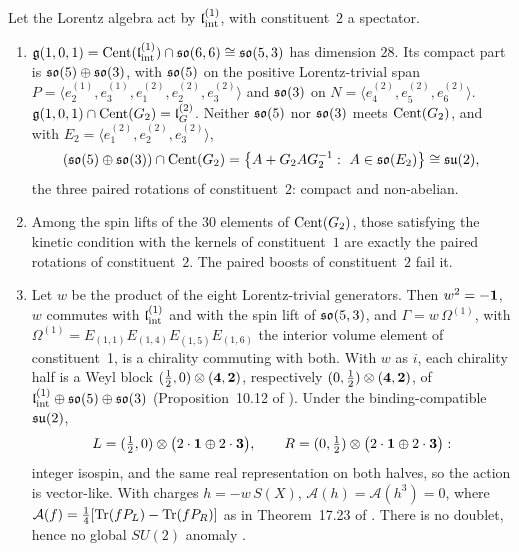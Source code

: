 \begin{proposition}
\label{e5:prop:spectator}
Let the Lorentz algebra act by $\mathfrak l_{\rm int}^{(1)}$, with constituent~$2$ a spectator.
\begin{enumerate}[label=(\roman*),leftmargin=2.2em]
\item $\mathfrak g(1,0,1)=\operatorname{Cent}(\mathfrak l_{\rm int}^{(1)})\cap\mathfrak{so}(6,6)\cong\mathfrak{so}(5,3)$ has dimension $28$. Its compact part is $\mathfrak{so}(5)\oplus\mathfrak{so}(3)$, with $\mathfrak{so}(5)$ on the
positive Lorentz-trivial span $P=\langle e^{(1)}_2,e^{(1)}_3,e^{(2)}_1,e^{(2)}_2,e^{(2)}_3\rangle$ and $\mathfrak{so}(3)$ on $N=\langle e^{(2)}_4,e^{(2)}_5,e^{(2)}_6\rangle$.
$\mathfrak g(1,0,1)\cap\operatorname{Cent}(G_2)=\mathfrak l_G^{(2)}$. Neither $\mathfrak{so}(5)$ nor $\mathfrak{so}(3)$ meets $\operatorname{Cent}(G_2)$, and with $E_2=\langle e^{(2)}_1,e^{(2)}_2,e^{(2)}_3\rangle$,
\[
(\so5\oplus\so3)\cap\Cent(G_2)=\bigl\{A+G_2AG_2^{-1}:\ A\in\so{E_2}\bigr\}\cong\su2 ,
\]
the three paired rotations of constituent~$2$: compact and non-abelian.
\item Among the spin lifts of the $30$ elements of $\operatorname{Cent}(G_2)$, those satisfying the kinetic condition with the kernels of constituent~$1$ are
exactly the paired rotations of constituent~$2$. The paired boosts of constituent~$2$ fail it.
\item Let $w$ be the product of the eight Lorentz-trivial generators. Then $w^2=-\mathbf 1$, $w$ commutes with $\mathfrak l_{\rm int}^{(1)}$ and with the spin lift of
$\mathfrak{so}(5,3)$, and $\Gamma=w\,\Omega^{(1)}$, with $\Omega^{(1)}=E_{(1,1)}E_{(1,4)}E_{(1,5)}E_{(1,6)}$ the interior volume element of
constituent~1, is a chirality commuting with both. With $w$ as $i$, each chirality half is a Weyl block $(\tfrac12,0)\otimes(\mathbf4,\mathbf2)$, respectively $(0,\tfrac12)\otimes(\mathbf4,\mathbf2)$, of
$\mathfrak l_{\rm int}^{(1)}\oplus\mathfrak{so}(5)\oplus\mathfrak{so}(3)$ (Proposition~10.12 of \cite{ES17}). Under the binding-compatible $\mathfrak{su}(2)$,
\[
L=(\tfrac12,0)\otimes\bigl(2\cdot\mathbf1\oplus2\cdot\mathbf3\bigr),\qquad R=(0,\tfrac12)\otimes\bigl(2\cdot\mathbf1\oplus2\cdot\mathbf3\bigr):
\]
integer isospin, and the same real representation on both halves, so the action is vector-like. With charges $h=-w\,S(X)$,
$\mathcal A(h)=\mathcal A(h^3)=0$, where $\mathcal A(f)=\tfrac14[\operatorname{Tr}(fP_L)-\operatorname{Tr}(fP_R)]$ as in Theorem~17.23 of \cite{ES17}. There is no doublet, hence no
global $SU(2)$ anomaly \cite{Witten82}.
\end{enumerate}
\end{proposition}

